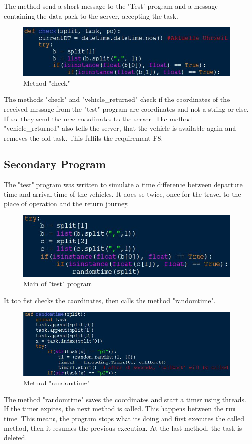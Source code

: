 The method send a short message to the "Test" program and a message containing the data pack to the server, accepting the task.
\begin{figure}[!h]
\center
\includegraphics[scale=0.6]{images/Heiber/a13.JPG}
\caption[caption]{Method "check"}
\end{figure}
\newline
The methods "check" and "vehicle\_returned" check if the coordinates of the received message from the "test" program are coordinates and not a string or else. If so, they send the new coordinates to the server. The method "vehicle\_returned" also tells the server, that the vehicle is available again and removes the old task. This fulfils the requirement F8.
\subsection{Secondary Program}
The "test" program was written to simulate a time difference between departure time and arrival time of the vehicles. It does so twice, once for the travel to the place of operation and the return journey.
\begin{figure}[!h]
\center
\includegraphics[scale=0.6]{images/Heiber/a14.JPG}
\caption[caption]{Main of "test" program}
\end{figure}
\newline
It too fist checks the coordinates, then calls the method "randomtime".
\begin{figure}[!h]
\center
\includegraphics[scale=0.6]{images/Heiber/a15.JPG}
\caption[caption]{Method "randomtime"}
\end{figure}
\newline
The method "randomtime" saves the coordinates and start a timer using threads. If the timer expires, the next method is called. This happens between the run time. This means, the program stops what its doing and first executes the called method, then it resumes the previous execution. At the last method, the task is deleted.
\newline

